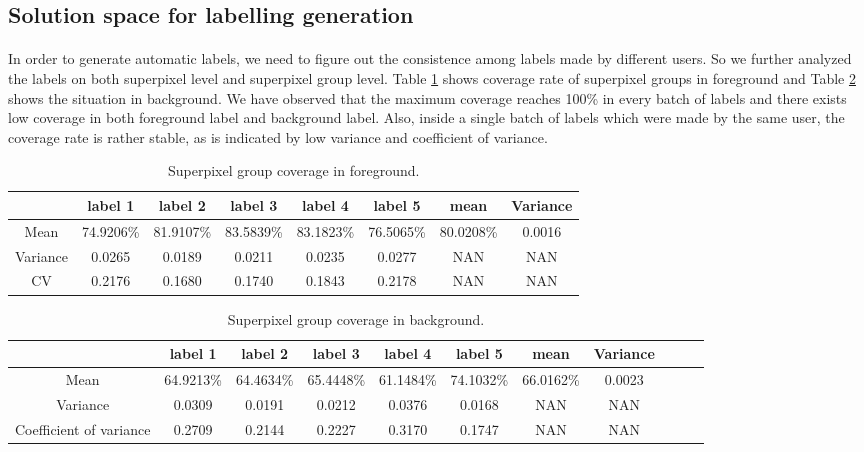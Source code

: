 \documentclass[runningheads,a4paper]{llncs}
\begin{document}
\subsection{Solution space for labelling generation}
\paragraph{} In order to generate automatic labels, we need to figure out the consistence among labels made by different users. So we further analyzed the labels on both superpixel level and superpixel group level. Table \ref{ta: label coverage f} shows coverage rate of superpixel groups in foreground and Table \ref{ta: label coverage b} shows the situation in background.
We have observed that the maximum coverage reaches 100\% in every batch of labels and there exists low coverage in both foreground label and background label. Also, inside a single batch of labels which were made by the same user, the coverage rate is rather stable, as is indicated by low variance and coefficient of variance.


\begin{table}
\centering
\begin{tabular}{|c|c|c|c|c|c|c|c|}
\hline
 & label 1 & label 2&label 3&label 4&label 5&mean&Variance\\
\hline
Mean& 74.9206\% & 81.9107\% & 83.5839\%& 83.1823\%& 76.5065\%&80.0208\%&0.0016 \\
\hline
Variance& 0.0265 & 0.0189 & 0.0211& 0.0235& 0.0277&NAN&NAN \\
\hline
CV& 0.2176 & 0.1680 & 0.1740& 0.1843& 0.2178&NAN&NAN \\
\hline
\end{tabular}
\caption{Superpixel group coverage in foreground.}
\label{ta: label coverage f}
\end{table}

\begin{table}
\centering
\begin{tabular}{|c|c|c|c|c|c|c|c|c|c|c|}
\hline
 & label 1 & label 2&label 3&label 4&label 5&mean&Variance \\
\hline
Mean& 64.9213\% & 64.4634\% & 65.4448\%& 61.1484\%& 74.1032\%&66.0162\%&0.0023 \\
\hline
Variance& 0.0309 & 0.0191 & 0.0212& 0.0376& 0.0168&NAN&NAN \\
\hline
Coefficient of variance& 0.2709 & 0.2144 & 0.2227& 0.3170& 0.1747&NAN&NAN \\
\hline
\end{tabular}
\caption{Superpixel group coverage in background.}
\label{ta: label coverage b}
\end{table}
\end{document}
